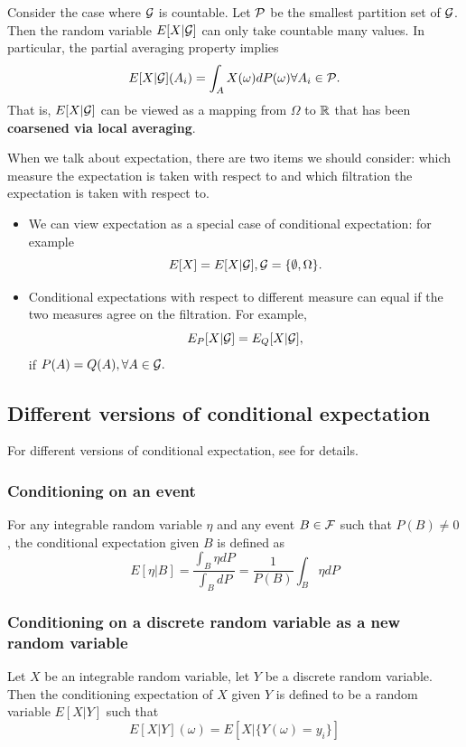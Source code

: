 \begin{refsection}
\begin{note}
Consider the case where $\mathcal{G}$ is countable.	
Let $\mathcal{P}$ be the smallest partition set of $\mathcal{G}$. Then the random variable $E[X|\mathcal{G}]$ can only take countable many values. In particular, the partial averaging property implies
$$E[X|\mathcal{G}](A_i) = \int_A X(\omega)dP(\omega) \forall A_i \in \mathcal{P}.$$
That is, $E[X|\mathcal{G}]$ can be viewed as a mapping from $\Omega$ to $\mathbb{R}$ that has been \textbf{coarsened via local averaging}.	
\end{note}

\begin{note}
When we talk about expectation, there are two items we should consider: which measure the expectation is taken with respect to and which filtration the expectation is taken with respect to.
\begin{itemize}
	\item We can view expectation as a special case of conditional expectation: for example
	$$E[X] = E[X|\mathcal{G}], \mathcal{G} = \{\emptyset, \Omega\}.$$
	\item Conditional expectations with respect to different measure can equal if the two measures agree on the filtration. For example,
	$$E_P[X|\mathcal{G}] = E_Q[X|\mathcal{G}],$$
	if $P(A) = Q(A), \forall A\in \mathcal{G}.$ 
\end{itemize}
\end{note}

\subsection{Different versions of conditional expectation}
\begin{remark}
For different versions of conditional expectation, see \cite[17]{mikosch1998elementary} for details.
\end{remark}

\subsubsection{Conditioning on an event}
\begin{definition}
For any integrable random variable $\eta$ and any event $B\in \mathcal{F}$ such that $P(B)\neq 0$, the conditional expectation given $B$ is defined as
$$E[\eta|B] = \frac{\int_B \eta dP}{\int_B dP}=\frac{1}{P(B)}\int_B \eta dP$$
\end{definition}

\subsubsection{Conditioning on a discrete random variable as a new random variable}
\begin{definition}
Let $X$ be an integrable random variable, let $Y$ be a discrete random variable. Then the conditioning expectation of $X$ given $Y$ is defined to be a random variable $E[X|Y]$ such that 
$$E[X|Y](\omega) = E[X|\{Y(\omega)=y_i\}]$$
\end{definition}


\end{refsection}
